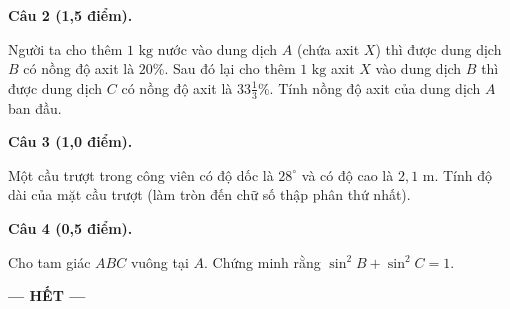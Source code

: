 \documentclass[12pt,a4paper]{article}
\begin{document}
\vspace{2mm}
\noindent\textbf{Câu 2 (1,5 điểm).}

Người ta cho thêm $1\text{ kg}$ nước vào dung dịch $A$ (chứa axit $X$) thì được dung dịch $B$ có nồng độ axit là $20\%$. Sau đó lại cho thêm $1\text{ kg}$ axit $X$ vào dung dịch $B$ thì được dung dịch $C$ có nồng độ axit là $33\frac{1}{3}\%$. Tính nồng độ axit của dung dịch $A$ ban đầu.

\vspace{2mm}
\noindent\textbf{Câu 3 (1,0 điểm).}

Một cầu trượt trong công viên có độ dốc là $28^\circ$ và có độ cao là $2{,}1\text{ m}$. Tính độ dài của mặt cầu trượt (làm tròn đến chữ số thập phân thứ nhất).
\begin{center}
\end{center}

\vspace{2mm}
\noindent\textbf{Câu 4 (0,5 điểm).}

Cho tam giác $ABC$ vuông tại $A$. Chứng minh rằng $\sin^2 B + \sin^2 C = 1$.

\vspace{2mm}

\vfill
\begin{center}
  \textbf{--- HẾT ---}
\end{center}
\end{document}
